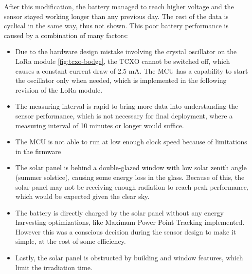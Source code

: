 After this modification, the battery managed to reach higher voltage and the sensor stayed working longer than any previous day. The rest of the data is cyclical in the same way, thus not shown. This poor battery performance is caused by a combination of many factors:
\begin{itemize}
    \item Due to the hardware design mistake involving the crystal oscillator on the LoRa module \ref{fig:tcxo-bodge}, the TCXO cannot be switched off, which causes a constant current draw of 2.5 mA. The MCU has a capability to start the oscillator only when needed, which is implemented in the following revision of the LoRa module.
    \item The measuring interval is rapid to bring more data into understanding the sensor performance, which is not necessary for final deployment, where a measuring interval of 10 minutes or longer would suffice.
    \item The MCU is not able to run at low enough clock speed because of limitations in the firmware
    \item The solar panel is behind a double-glazed window with low solar zenith angle (summer solstice), causing some energy loss in the glass. Because of this, the solar panel may not be receiving enough radiation to reach peak performance, which would be expected given the clear sky.
    \item The battery is directly charged by the solar panel without any energy harvesting optimizations, like Maximum Power Point Tracking implemented. However this was a conscious decision during the sensor design to make it simple, at the cost of some efficiency.
    \item Lastly, the solar panel is obstructed by building and window features, which limit the irradiation time.
\end{itemize}

